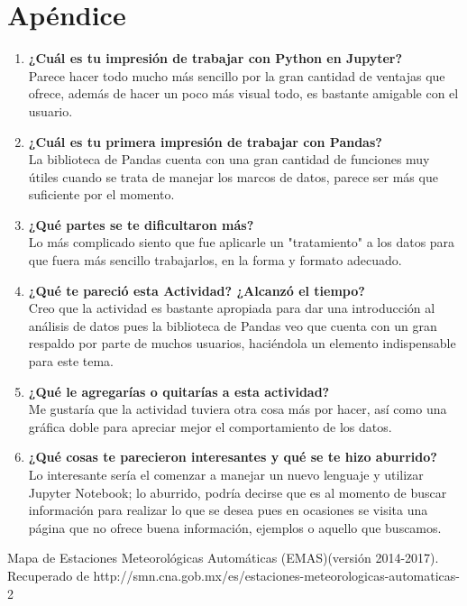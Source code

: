\documentclass[12pt]{article}
\begin{document}
\section{Apéndice}
\begin{enumerate}
\item \textbf{¿Cuál es tu impresión de trabajar con Python en Jupyter?} \\ [0.15cm]
Parece hacer todo mucho más sencillo por la gran cantidad de ventajas que ofrece, además de hacer un poco más visual todo, es bastante amigable con el usuario.

\item \textbf{¿Cuál es tu primera impresión de trabajar con Pandas?} \\ [0.15cm]
La biblioteca de Pandas cuenta con una gran cantidad de funciones muy útiles cuando se trata de manejar los marcos de datos, parece ser más que suficiente por el momento.

\item \textbf{¿Qué partes se te dificultaron más?} \\ [0.15cm]
Lo más complicado siento que fue aplicarle un "tratamiento" a los datos para que fuera más sencillo trabajarlos, en la forma y formato adecuado.

\item \textbf{¿Qué te pareció esta Actividad? ¿Alcanzó el tiempo?} \\ [0.15cm]
Creo que la actividad es bastante apropiada para dar una introducción al análisis de datos pues la biblioteca de Pandas veo que cuenta con un gran respaldo por parte de muchos usuarios, haciéndola un elemento indispensable para este tema. 

\item \textbf{¿Qué le agregarías o quitarías a esta actividad?} \\ [0.15cm]
Me gustaría que la actividad tuviera otra cosa más por hacer, así como una gráfica doble para apreciar mejor el comportamiento de los datos.

\item \textbf{¿Qué cosas te parecieron interesantes y qué se te hizo aburrido?} \\ [0.15cm]
Lo interesante sería el comenzar a manejar un nuevo lenguaje y utilizar Jupyter Notebook; lo aburrido, podría decirse que es al momento de buscar información para realizar lo que se desea pues en ocasiones se visita una página que no ofrece buena información, ejemplos o aquello que buscamos.

\end{enumerate}

\begin{thebibliography}{1}
	 Mapa de Estaciones Meteorológicas Automáticas (EMAS)(versión 2014-2017). Recuperado de http://smn.cna.gob.mx/es/estaciones-meteorologicas-automaticas-2
	
\end{thebibliography}
\end{document}
